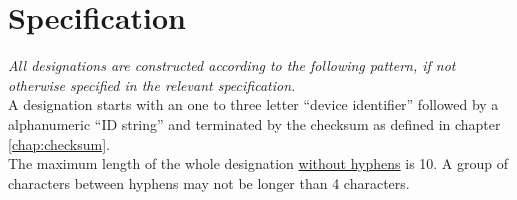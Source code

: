 %
%
%
%
%
%
%

\section{Specification}

\textit{All designations are constructed according to the following pattern, if
not otherwise specified in the relevant specification.} \\


A designation starts with an one to three letter ``device identifier'' followed
by a alphanumeric ``ID string'' and terminated by the checksum as defined in
chapter \ref{chap:checksum}. \\

The maximum length of the whole designation \underline{without hyphens} is 10. A
group of characters between hyphens may not be longer than 4 characters.



%
%




